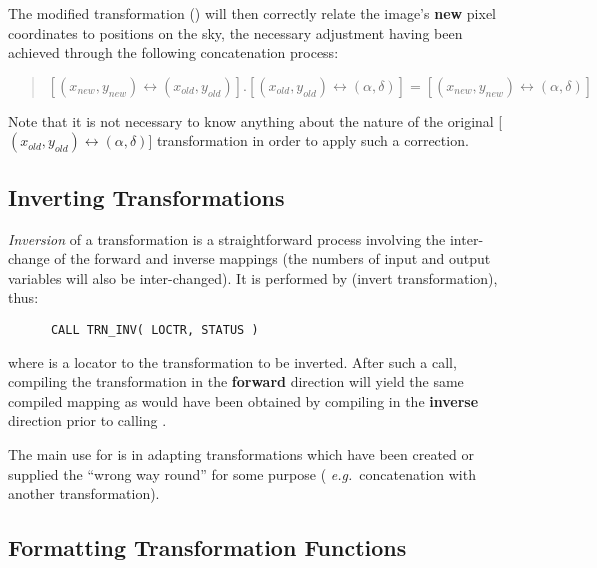 The modified transformation (\/) will then correctly relate
the image's {\bf new} pixel coordinates to positions on the sky, the
necessary adjustment having been achieved through the following
concatenation process: 

\begin{quote}
\begin{center}
$[(x_{new},y_{new}) \leftrightarrow (x_{old},y_{old})].[(x_{old},y_{old}) 
\leftrightarrow (\alpha,\delta)] = [(x_{new},y_{new}) \leftrightarrow 
(\alpha,\delta)]$
\end{center}
\end{quote}

Note that it is not necessary to know anything about the nature of the
original \mbox{[$(x_{old},y_{old}) \leftrightarrow (\alpha,\delta)$]}
transformation in order to apply such a correction. 
\exampledone


\subsection{Inverting Transformations}

\label{section:additional:inverting}

{\em Inversion} of a transformation is a straightforward process involving
the inter-change of the forward and inverse mappings (the numbers of input
and output variables will also be inter-changed).
It is performed by  (invert transformation), thus:

\begin{verbatim}
      CALL TRN_INV( LOCTR, STATUS )
\end{verbatim}

where  is a locator to the transformation to be inverted.
After such a call, compiling the transformation in the {\bf forward}
direction will yield the same compiled mapping as would have been obtained
by compiling in the {\bf inverse} direction prior to calling
. 

The main use for  is in adapting transformations which have
been created or supplied the ``wrong way round'' for some purpose ({\em
e.g.}\ concatenation with another transformation). 


\subsection{Formatting Transformation Functions}

\label{section:additional:formatting}

